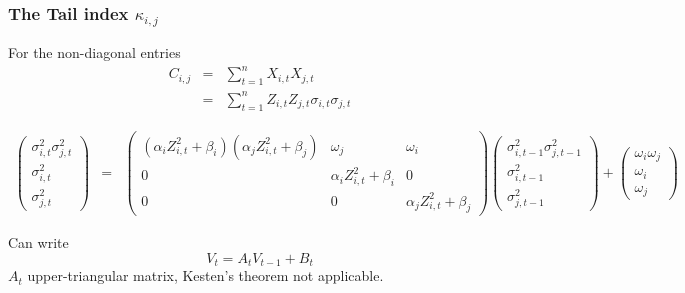 \documentclass{beamer}
\begin{document}
  \begin{frame}
  \frametitle{The Tail index $\kappa_{i,j}$}
    For the non-diagonal entries
    \begin{eqnarray*}
      C_{i, j} &=& \sum_{t=1}^n X_{i, t} X_{j, t} \\
      &=& \sum_{t=1}^n Z_{i, t} Z_{j, t} \sigma_{i, t} \sigma_{j, t}
    \end{eqnarray*}

    \begin{tiny}
      \begin{eqnarray*}
        \begin{pmatrix}
          \sigma_{i,t}^2 \sigma_{j,t}^2 \\
          \sigma_{i,t}^2 \\
          \sigma_{j,t}^2
        \end{pmatrix}
        &=&
        \begin{pmatrix}
          (\alpha_i Z_{i,t}^2 + \beta_i) (\alpha_j Z_{i,t}^2 + \beta_j) & \omega_j & \omega_i \\
          0 & \alpha_i Z_{i,t}^2 + \beta_i & 0 \\
          0 & 0 & \alpha_j Z_{i,t}^2 + \beta_j
        \end{pmatrix}
        \begin{pmatrix}
          \sigma_{i,t-1}^2 \sigma_{j,t-1}^2 \\
          \sigma_{i,t-1}^2 \\
          \sigma_{j,t-1}^2
        \end{pmatrix} +
        \begin{pmatrix}
          \omega_i \omega_j\\
          \omega_i \\
          \omega_j
        \end{pmatrix}
      \end{eqnarray*}
    \end{tiny}
    Can write
    \[
    V_t = A_t V_{t-1} + B_t
    \]
    $A_t$ upper-triangular matrix, Kesten's theorem not applicable.
  \end{frame}


\end{document}
